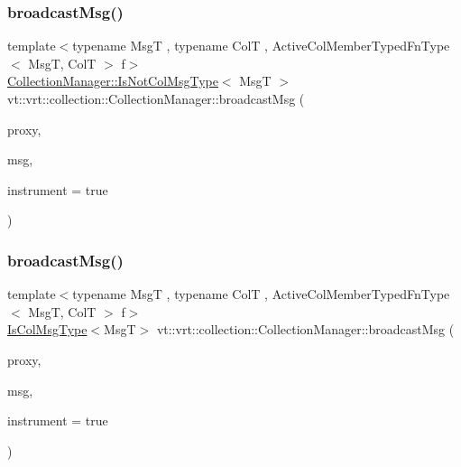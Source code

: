 \subsubsection{\texorpdfstring{broadcast\+Msg()}{broadcastMsg()}\hspace{0.1cm}{\footnotesize\ttfamily [4/6]}}
{\footnotesize\ttfamily template$<$typename MsgT , typename ColT , Active\+Col\+Member\+Typed\+Fn\+Type$<$ Msg\+T, Col\+T $>$ f$>$ \\
\hyperlink{structvt_1_1vrt_1_1collection_1_1_collection_manager_ae376deeefd4f89a0b1c93849977715d9}{Collection\+Manager\+::\+Is\+Not\+Col\+Msg\+Type}$<$ MsgT $>$ vt\+::vrt\+::collection\+::\+Collection\+Manager\+::broadcast\+Msg (\begin{DoxyParamCaption}\item[{\hyperlink{structvt_1_1vrt_1_1collection_1_1_collection_manager_a56458ed7f9bb22b631b9b3a745f42f94}{Collection\+Proxy\+Wrap\+Type}$<$ ColT $>$ const \&}]{proxy,  }\item[{MsgT $\ast$}]{msg,  }\item[{bool}]{instrument = {\ttfamily true} }\end{DoxyParamCaption})}

\mbox{\label{structvt_1_1vrt_1_1collection_1_1_collection_manager_a5ec1684e67f1e5aec6b94cdcf17e5777}} 
\subsubsection{\texorpdfstring{broadcast\+Msg()}{broadcastMsg()}\hspace{0.1cm}{\footnotesize\ttfamily [5/6]}}
{\footnotesize\ttfamily template$<$typename MsgT , typename ColT , Active\+Col\+Member\+Typed\+Fn\+Type$<$ Msg\+T, Col\+T $>$ f$>$ \\
\hyperlink{structvt_1_1vrt_1_1collection_1_1_collection_manager_a21c21612c806016788057aeab142af20}{Is\+Col\+Msg\+Type}$<$MsgT$>$ vt\+::vrt\+::collection\+::\+Collection\+Manager\+::broadcast\+Msg (\begin{DoxyParamCaption}\item[{\hyperlink{structvt_1_1vrt_1_1collection_1_1_collection_manager_a56458ed7f9bb22b631b9b3a745f42f94}{Collection\+Proxy\+Wrap\+Type}$<$ ColT $>$ const \&}]{proxy,  }\item[{MsgT $\ast$}]{msg,  }\item[{bool}]{instrument = {\ttfamily true} }\end{DoxyParamCaption})}

